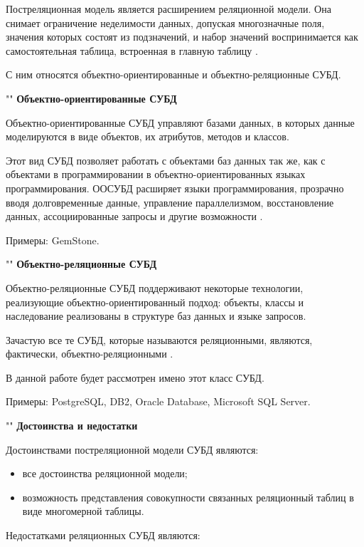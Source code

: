 \documentclass{bmstu}
\begin{document}
Постреляционная модель является расширением реляционной модели. Она снимает ограничение неделимости данных, допуская многозначные поля, значения которых состоят из подзначений, и набор значений воспринимается как самостоятельная таблица, встроенная в главную таблицу \cite{post-rel}.

С ним относятся объектно-ориентированные и объектно-реляционные СУБД.

""\newline
\noindent\textbf{Объектно-ориентированные СУБД}

Объектно-ориентированные СУБД управляют базами данных, в которых данные моделируются в виде объектов, их атрибутов, методов и классов.

Этот вид СУБД позволяет работать с объектами баз данных так же, как с объектами в программировании в объектно-ориентированных языках программирования. ООСУБД расширяет языки программирования, прозрачно вводя долговременные данные, управление параллелизмом, восстановление данных, ассоциированные запросы и другие возможности \cite{dbms}.

Примеры: GemStone.

""\newline
\noindent\textbf{Объектно-реляционные СУБД}

Объектно-реляционные СУБД поддерживают некоторые технологии, реализующие объектно-ориентированный подход: объекты, классы и наследование реализованы в структуре баз данных и языке запросов.

Зачастую все те СУБД, которые называются реляционными, являются, фактически, объектно-реляционными \cite{dbms}.

В данной работе будет рассмотрен имено этот класс СУБД.

Примеры: PostgreSQL, DB2, Oracle Database, Microsoft SQL Server.

""\newline
\noindent\textbf{Достоинства и недостатки}

Достоинствами постреляционной модели СУБД являются:

\begin{itemize}
	\item все достоинства реляционной модели;
	\item возможность представления совокупности связанных реляционный таблиц в виде многомерной таблицы.
\end{itemize}

Недостатками реляционных СУБД являются:
\end{document}
